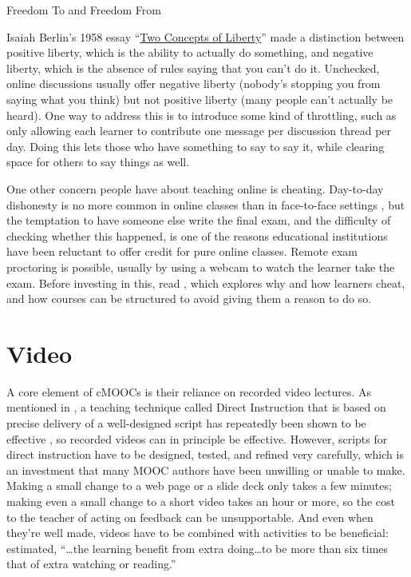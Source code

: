 \begin{callout}{Freedom To and Freedom From}

  Isaiah Berlin's 1958 essay
  ``\href{https://en.wikipedia.org/wiki/Two_Concepts_of_Liberty}{Two
    Concepts of Liberty}'' made a distinction between positive
  liberty, which is the ability to actually do something, and negative
  liberty, which is the absence of rules saying that you can't do
  it. Unchecked, online discussions usually offer negative liberty
  (nobody's stopping you from saying what you think) but not positive
  liberty (many people can't actually be heard). One way to address
  this is to introduce some kind of throttling, such as only allowing
  each learner to contribute one message per discussion thread per
  day. Doing this lets those who have something to say to say it,
  while clearing space for others to say things as well.

\end{callout}

One other concern people have about teaching online is cheating.
Day-to-day dishonesty is no more common in online classes than in
face-to-face settings \cite{Beck2014}, but the temptation to have
someone else write the final exam, and the difficulty of checking
whether this happened, is one of the reasons educational institutions
have been reluctant to offer credit for pure online classes. Remote
exam proctoring is possible, usually by using a webcam to watch the
learner take the exam.  Before investing in this, read
\cite{Lang2013}, which explores why and how learners cheat, and how
courses can be structured to avoid giving them a reason to do so.

\section{Video}\label{s:online-video}

A core element of cMOOCs is their reliance on recorded video lectures.
As mentioned in , a teaching technique called
Direct Instruction that is based on precise delivery of a
well-designed script has repeatedly been shown to be effective
\cite{Stoc2018}, so recorded videos can in principle be effective.
However, scripts for direct instruction have to be designed, tested,
and refined very carefully, which is an investment that many MOOC
authors have been unwilling or unable to make.  Making a small change
to a web page or a slide deck only takes a few minutes; making even a
small change to a short video takes an hour or more, so the cost to
the teacher of acting on feedback can be unsupportable.  And even when
they're well made, videos have to be combined with activities to be
beneficial: \cite{Koed2015} estimated, ``{\ldots}the learning benefit
from extra doing{\ldots}to be more than six times that of extra
watching or reading.''

